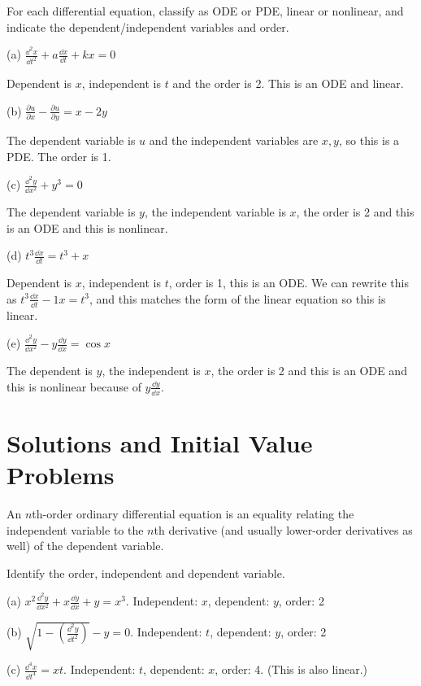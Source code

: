 \documentclass[../diffeq.tex]{subfiles}
\begin{document}
\begin{example}
    For each differential equation, classify as ODE or PDE, linear or nonlinear, and indicate the dependent/independent variables and order.

    (a) $\frac{\dd^2 x}{\dd t^2}+a\frac{\dd x}{\dd t}+kx =0$

    Dependent is $x$, independent is $t$ and the order is 2. This is an ODE and linear.

    (b) $\frac{\partial u}{\partial x} - \frac{\partial u}{\partial y}=x-2y$ 

    The dependent variable is $u$ and the independent variables are $x,y$, so this is a PDE. The order is 1.

    (c) $\frac{\dd^2 y}{\dd x^2}+y^3=0$

    The dependent variable is $y$, the independent variable is $x$, the order is 2 and this is an ODE and this is nonlinear.

    (d) $t^3 \frac{\dd x}{\dd t} = t^3+x$

    Dependent is $x$, independent is $t$, order is 1, this is an ODE. We can rewrite this as $t^3\frac{\dd x}{\dd t}-1x=t^3$, and this matches the form of the linear equation so this is linear.

    (e) $\frac{\dd^2 y}{\dd x^2} - y\frac{\dd y}{\dd x}=\cos x$

    The dependent is $y$, the independent is $x$, the order is 2 and this is an ODE and this is nonlinear because of $y\frac{\dd y}{\dd x}$.
\end{example}

\section{Solutions and Initial Value Problems}
An $n$th-order ordinary differential equation is an equality relating the independent variable to the $n$th derivative (and usually lower-order derivatives as well) of the dependent variable.

\begin{example}
    Identify the order, independent and dependent variable.

    (a) $x^2\frac{\dd^2 y}{\dd x^2} + x\frac{\dd y}{\dd x} + y =x^3$. Independent: $x$, dependent: $y$, order: 2

    (b) $\sqrt{1-\left(\frac{\dd^2 y}{\dd t^2}\right)}-y=0$. Independent: $t$, dependent: $y$, order: 2

    (c) $\frac{\dd^4 x}{\dd t^4}=xt$. Independent: $t$, dependent: $x$, order: 4. (This is also linear.)
\end{example}
\end{document}
